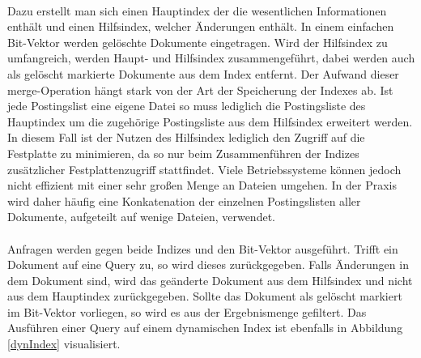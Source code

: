 \paragraph{}
Dazu erstellt man sich einen Hauptindex der die wesentlichen Informationen enthält und einen Hilfsindex, welcher Änderungen enthält. In einem einfachen Bit-Vektor werden gelöschte Dokumente eingetragen. Wird der Hilfsindex zu umfangreich, werden Haupt- und Hilfsindex zusammengeführt, dabei werden auch als gelöscht markierte Dokumente aus dem Index entfernt. Der Aufwand dieser merge-Operation hängt stark von der Art der Speicherung der Indexes ab. Ist jede Postingslist eine eigene Datei so muss lediglich die Postingsliste des Hauptindex um die zugehörige Postingsliste aus dem Hilfsindex erweitert werden. In diesem Fall ist der Nutzen des Hilfsindex lediglich den Zugriff auf die Festplatte zu minimieren, da so nur beim Zusammenführen der Indizes zusätzlicher Festplattenzugriff stattfindet. Viele Betriebssysteme können jedoch nicht effizient mit einer sehr großen Menge an Dateien umgehen. In der Praxis wird daher häufig eine Konkatenation der einzelnen Postingslisten aller Dokumente, aufgeteilt auf wenige Dateien, verwendet.\par

\paragraph{}
Anfragen werden gegen beide Indizes und den Bit-Vektor ausgeführt. Trifft ein Dokument auf eine Query zu, so wird dieses zurückgegeben. Falls Änderungen in dem Dokument sind, wird das geänderte Dokument aus dem Hilfsindex und nicht aus dem Hauptindex zurückgegeben. Sollte das Dokument als gelöscht markiert im Bit-Vektor vorliegen, so wird es aus der Ergebnismenge  gefiltert. Das Ausführen einer Query auf einem dynamischen Index ist ebenfalls in Abbildung \ref{dynIndex} visualisiert.\par

